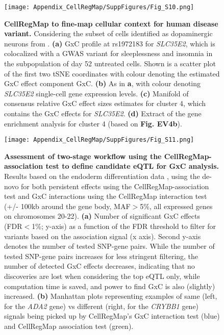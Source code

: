 \begin{figure}[h]
    \centering
    \texttt{[image: Appendix\_CellRegMap/SuppFigures/Fig\_S10.png]}
    \caption{\textbf{CellRegMap to fine-map cellular context for human disease variant.} 
    Considering the subset of cells identified as dopaminergic neurons from \cite{jerber2021population}. \textbf{(a)} GxC profile at rs1972183 for \textit{SLC35E2}, which is colocalized with a GWAS variant for sleeplessness and insomnia in the subpopulation of day 52 untreated cells. 
    Shown is a scatter plot of the first two tSNE coordinates with colour denoting the estimated GxC effect component GxC. 
    \textbf{(b)} As in \textbf{a}, with colour denoting \textit{SLC35E2} single-cell gene expression levels. 
    \textbf{(c)} Manifold of consensus relative GxC effect sizes estimates for cluster 4, which contains the GxC effects for \textit{SLC35E2}.  
    \textbf{(d)} Extract of the gene enrichment analysis for cluster 4 (based on \textbf{Fig. EV4b}).
}
\end{figure}

\begin{figure}[h]
    \centering
    \texttt{[image: Appendix\_CellRegMap/SuppFigures/Fig\_S11.png]}
    \caption{\textbf{Assessment of two-stage workflow using the CellRegMap-association test to define candidate eQTL for GxC analysis.} 
    Results based on the endoderm differentiation data \cite{cuomo2020single}, using the de-novo for both persistent effects using  the CellRegMap-association test and GxC interactions using the CellRegMap interaction test (+/- 100kb around the gene body, MAF$>$5\%, all expressed genes on chromosomes 20-22). 
    \textbf{(a)} Number of significant GxC effects (FDR$<$1\%; y-axis) as a function of the FDR threshold to filter for variants based on the association signal (x axis). 
    Second y-axis denotes the number of tested SNP-gene pairs. 
    While the number of tested SNP-gene pairs increases for less stringent filtering, the number of detected GxC effects decreases, indicating that no discoveries are lost when considering the top eQTL only, while computation time is saved, and power to find GxC is also (slightly) increased. 
    \textbf{(b)} Manhattan plots representing examples of same (left, for the \textit{ADA2} gene) vs different (right, for the \textit{CRYBB1} gene) signals being picked up by CellRegMap’s GxC interaction test (blue) and CellRegMap association test (green).
}
\end{figure}